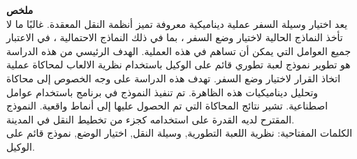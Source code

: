 \documentclass[12pt]{report}
\begin{document}
\begin{center}
   \begin{otherlanguage}{arabic}
   \textbf{ملخص}\\
 \vspace{0.2cm}
يعد اختيار وسيلة السفر عملية ديناميكية معروفة تميز أنظمة النقل المعقدة. غالبًا ما لا تأخذ النماذج الحالية لاختيار وضع السفر ، بما في ذلك النماذج الاحتمالية ، في الاعتبار جميع العوامل التي يمكن أن تساهم في هذه العملية. الهدف الرئيسي من هذه الدراسة هو تطوير نموذج لعبة تطوري قائم على الوكيل باستخدام نظرية الالعاب لمحاكاة عملية اتخاذ القرار لاختيار وضع السفر. تهدف هذه الدراسة على وجه الخصوص إلى محاكاة وتحليل ديناميكيات هذه الظاهرة. تم تنفيذ النموذج في برنامج   باستخدام عوامل اصطناعية. تشير نتائج المحاكاة التي تم الحصول عليها إلى أنماط واقعية. النموذج المقترح لديه القدرة على استخدامه كجزء من تخطيط النقل في المدينة. 
\\
\vspace{0.2cm}
الكلمات المفتاحية: نظرية اللعبة التطورية, وسيلة النقل, اختيار الوضع, نموذج قائم على الوكيل.
\end{otherlanguage}
\\
\vspace{0.2cm}


\end{center}
\end{document}
